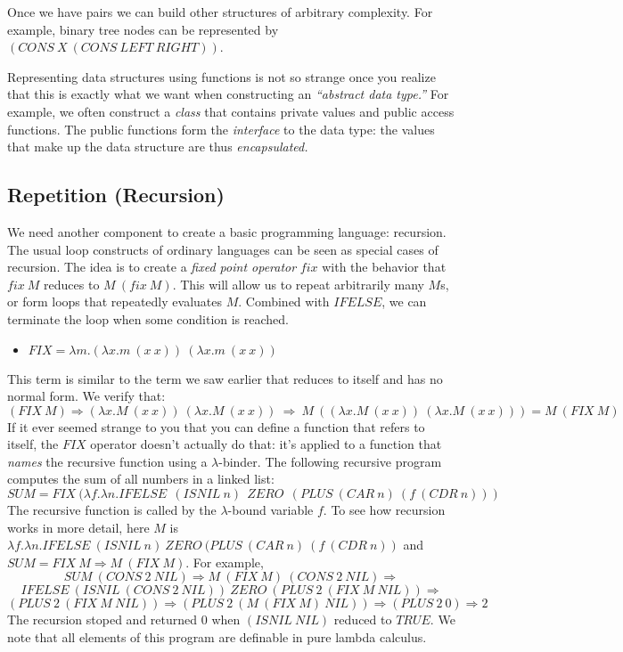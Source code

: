 Once we have pairs we can build other structures of arbitrary complexity.
For example, binary tree nodes can be represented by
$(CONS~X~(CONS ~LEFT~RIGHT))$.

\medskip

Representing data structures using functions is not so strange once you
realize that this is exactly what we want when constructing an {\em ``abstract
  data type.''}  For example, we often construct a {\em class\/} that contains
private values and public access functions.  The public functions form the
{\em interface\/} to the data type: the values that make up the data structure
are thus {\em encapsulated.}


\subsection{Repetition (Recursion)}

We need another component to create a
basic programming language: recursion.  The usual loop constructs of ordinary
languages can be seen as special cases of recursion. The idea is to create
a {\em fixed point operator\/} $fix$ with the behavior that $fix~M$
reduces to $M~(fix~M)$.  This will allow us to repeat arbitrarily many 
$M$s, or form loops that repeatedly evaluates $M$.  Combined with $IFELSE$, we
can terminate the loop when some condition is reached.
\begin{itemize}
  \item $FIX = \lambda m.(\lambda x.m~(x~x))~(\lambda x.m~(x~x))$
\end{itemize}
This term is similar to the term we saw earlier that reduces to itself
and has no normal form.  We verify that:
$$
(FIX~M) \Rightarrow (\lambda x.M~(x~x))~(\lambda x.M~(x~x)) ~\Rightarrow~
M~((\lambda x.M~(x~x))~(\lambda x.M~(x~x))) = M~(FIX~M)
$$
If it ever seemed strange to you that you can define a function that
refers to itself, the $FIX$ operator doesn't actually do that: it's applied
to a function that {\em names\/} the recursive function using a
$\lambda$-binder.
The following recursive program computes the sum of all numbers in a
linked list:
$$SUM = FIX~ (\lambda f.\lambda n.IFELSE~~ (ISNIL~ n)~~ ZERO ~~(PLUS~ (CAR~ n)~
(f~ (CDR~n)))$$
The recursive function is called by the $\lambda$-bound variable $f$.
To see how recursion works in more detail, here $M$ is
$\lambda f.\lambda n.IFELSE~ (ISNIL~ n)~ ZERO ~(PLUS~ (CAR~ n)~
(f~ (CDR~n))$ and $SUM = FIX~M \Rightarrow M~(FIX ~M)$.
For example, 
$$SUM~ (CONS~2~NIL) \Rightarrow M~(FIX~M)~ (CONS~2~NIL) \Rightarrow$$
$$IFELSE~(ISNIL~ (CONS~2~NIL))~ZERO ~ (PLUS~ 2~(FIX~M ~NIL)) \Rightarrow$$
$$ (PLUS~ 2~(FIX~M ~NIL)) \Rightarrow (PLUS~ 2~(M~(FIX~M) ~NIL)) \Rightarrow
(PLUS~2~0)\Rightarrow 2$$
The recursion stoped and returned $0$ when $(ISNIL~NIL)$ reduced to $TRUE$.  
We note that all elements of this program are definable in pure lambda calculus.


